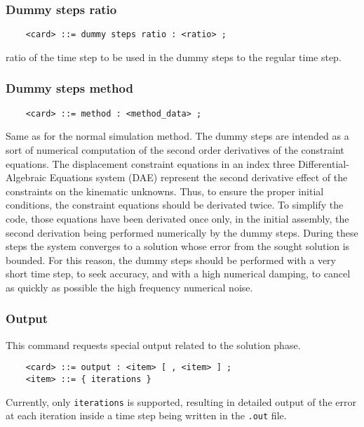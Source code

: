 \subsubsection{Dummy steps ratio}
\begin{verbatim}
    <card> ::= dummy steps ratio : <ratio> ;
\end{verbatim}
ratio of the time step to be used in the dummy steps to the regular
time step.

\subsubsection{Dummy steps method}
\begin{verbatim}
    <card> ::= method : <method_data> ;
\end{verbatim}
Same as for the normal simulation method. 
The dummy steps are intended as a sort of numerical computation 
of the second order derivatives of the constraint equations. 
The displacement constraint equations in an index three 
Differential-Algebraic Equations system
(DAE) represent the second derivative effect of the constraints on the
kinematic unknowns. Thus, to ensure the proper initial conditions, the
constraint equations should be derivated twice. To simplify the code,
those equations have been derivated once only, in the initial assembly,
the second derivation being performed numerically by the dummy steps.
During these steps the system converges to a solution whose error from
the sought solution is bounded. For this reason, the dummy steps
should be performed with a very short time step, to seek accuracy, and
with a high numerical damping, to cancel as quickly as possible the high
frequency numerical noise.

\subsubsection{Output}
This command requests special output related to the solution phase.
\begin{verbatim}
    <card> ::= output : <item> [ , <item> ] ;
    <item> ::= { iterations }
\end{verbatim}
Currently, only \texttt{iterations} is supported, resulting in
detailed output of the error at each iteration inside a time step
being written in the \texttt{.out} file.




